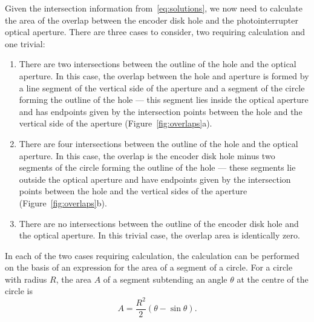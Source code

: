 \documentclass[a4paper,11pt,article]{memoir}
\begin{document}
Given the intersection information from~\eqref{eq:solutions}, we now
need to calculate the area of the overlap between the encoder disk
hole and the photointerrupter optical aperture. There are three cases
to consider, two requiring calculation and one trivial:
\begin{enumerate}
  \item{There are two intersections between the outline of the hole
    and the optical aperture. In this case, the overlap between the
    hole and aperture is formed by a line segment of the vertical side
    of the aperture and a segment of the circle forming the outline of
    the hole --- this segment lies inside the optical aperture and has
    endpoints given by the intersection points between the hole and
    the vertical side of the aperture (Figure~\ref{fig:overlaps}a).}
  \item{There are four intersections between the outline of the hole
    and the optical aperture. In this case, the overlap is the encoder
    disk hole minus two segments of the circle forming the outline of
    the hole --- these segments lie outside the optical aperture and
    have endpoints given by the intersection points between the hole
    and the vertical sides of the aperture
    (Figure~\ref{fig:overlaps}b).}
  \item{There are no intersections between the outline of the encoder
    disk hole and the optical aperture. In this trivial case, the
    overlap area is identically zero.}
\end{enumerate}
In each of the two cases requiring calculation, the calculation can be
performed on the basis of an expression for the area of a segment of a
circle. For a circle with radius $R$, the area $A$ of a segment
subtending an angle $\theta$ at the centre of the circle is
\begin{equation}
  \label{eq:segment}
  A = \frac{R^2}{2} (\theta - \sin \theta).
\end{equation}
\end{document}
